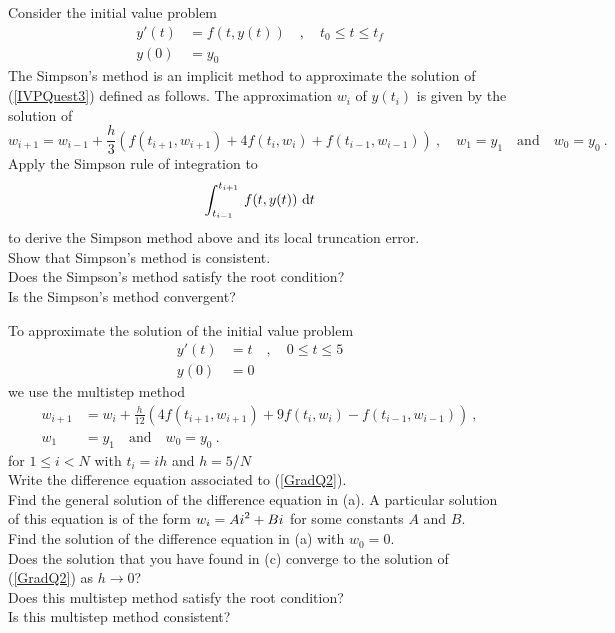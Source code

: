 \begin{question}
Consider the initial value problem
\begin{equation}
\begin{split}
y'(t) &= f(t,y(t)) \quad , \quad t_0 \leq t \leq t_f \\
y(0) &= y_0
\end{split} \label{IVPQuest3}
\end{equation}
The Simpson's method is an implicit method to approximate the solution
of (\ref{IVPQuest3}) defined as follows.  The approximation $w_i$ of
$y(t_i)$ is given by the solution of
\[
w_{i+1} = w_{i-1} + \frac{h}{3}\left( f(t_{i+1},w_{i+1}) + 4 
f(t_i,w_i) + f(t_{i-1},w_{i-1}) \right) \ , \quad
w_1 = y_1 \quad \text{and} \quad   w_0 = y_0 \ .
\]
 Apply the Simpson rule of integration to
\[
\int_{t_{i-1}}^{t_{i+1}}\, f(t,y(t))\,\,\mathrm{d}t
\]
to derive the Simpson method above and its local truncation error.\\
 Show that Simpson's method is consistent. \\
 Does the Simpson's method satisfy the root condition?\\
 Is the Simpson's method convergent?
\end{question}


\begin{question}
To approximate the solution of the initial value problem
\begin{equation}\label{GradQ2}
\begin{split}
y'(t) &= t \quad , \quad 0 \leq t \leq 5 \\
y(0) &= 0
\end{split}
\end{equation}
we use the multistep method
\begin{align}
w_{i+1} &= w_i + \frac{h}{12}\left( 4 f(t_{i+1},w_{i+1}) +
  9 f(t_i,w_i) - f(t_{i-1},w_{i-1}) \right) \ ,  \label{GradQ1} \\
w_1 & = y_1 \quad \text{and} \quad w_0 = y_0 \ .  \nonumber
\end{align}
for $1\leq i <N$ with $t_i = i h$ and $h = 5/N$\\
 Write the difference equation associated to (\ref{GradQ2}).\\
 Find the general solution of the difference equation
in (a).  A particular solution of this equation is of the form
$\displaystyle w_i = A i^2 + B i$ for some constants $A$ and $B$.\\
 Find the solution of the difference equation in (a)
with $w_0 = 0$.\\
 Does the solution that you have found in (c) converge to the
solution of (\ref{GradQ2}) as $h\to 0$?\\
 Does this multistep method satisfy the root condition?\\
 Is this multistep method consistent?
\end{question}

